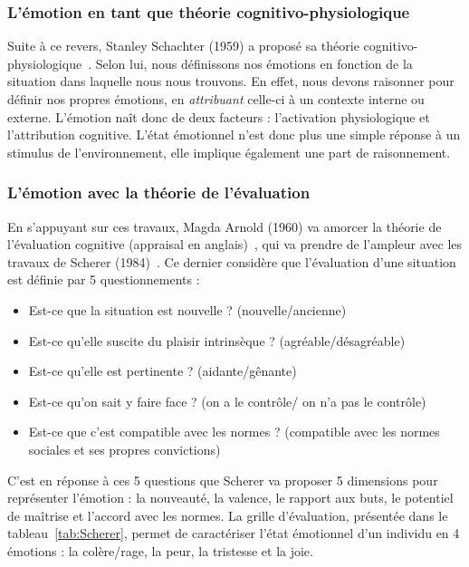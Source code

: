 \subsubsection{L'émotion en tant que théorie cognitivo-physiologique}
Suite à ce revers, Stanley Schachter (1959) a proposé sa théorie cognitivo-physiologique~\cite{Schachter1959,Schachter1962}. Selon lui, nous définissons nos émotions en fonction de la situation dans laquelle nous nous trouvons. En effet, nous devons raisonner pour définir nos propres émotions, en \textit{attribuant} celle-ci à un contexte interne ou externe. L'émotion naît donc de deux facteurs : l'activation physiologique et l'attribution cognitive. L'état émotionnel n'est donc plus une simple réponse à un stimulus de l'environnement, elle implique également une part de raisonnement.


\subsubsection{L'émotion avec la théorie de l'évaluation}
En s'appuyant sur ces travaux, Magda Arnold (1960) va amorcer la théorie de l'évaluation cognitive (appraisal en anglais)~\cite{Arnold1960}, qui va prendre de l'ampleur avec les travaux de Scherer (1984)~\cite{Scherer1984}. Ce dernier considère que l'évaluation d'une situation est définie par 5 questionnements :
\begin{itemize}
  \item Est-ce que la situation est nouvelle ? (nouvelle/ancienne)
  \item Est-ce qu'elle suscite du plaisir intrinsèque ? (agréable/désagréable)
  \item Est-ce qu'elle est pertinente ? (aidante/gênante)
  \item Est-ce qu'on sait y faire face ? (on a le contrôle/ on n'a pas le contrôle)
  \item Est-ce que c'est compatible avec les normes ? (compatible avec les normes sociales et ses propres convictions)
\end{itemize}

C'est en réponse à ces 5 questions que Scherer va proposer 5 dimensions pour représenter l'émotion : la nouveauté, la valence, le rapport aux buts, le potentiel de maîtrise et l'accord avec les normes. La grille d'évaluation, présentée dans le tableau~\ref{tab:Scherer}, permet de caractériser l'état émotionnel d'un individu en 4 émotions : la colère/rage, la peur, la tristesse et la joie.

